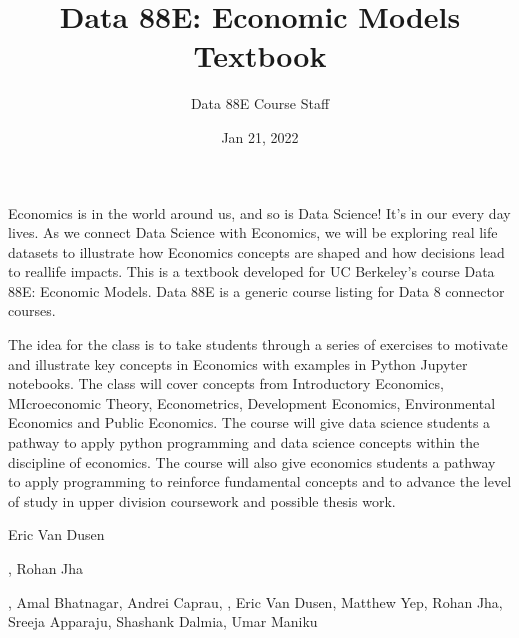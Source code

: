 \documentclass[letterpaper,10pt,english]{jupyterBook}
\title{Data 88E: Economic Models Textbook}
\date{Jan 21, 2022}
\author{Data 88E Course Staff}
\begin{document}
\pagestyle{empty}
\sphinxmaketitle
\pagestyle{plain}
\sphinxtableofcontents
\pagestyle{normal}
\label{\detokenize{content/intro::doc}}


\sphinxAtStartPar
Economics is in the world around us, and so is Data Science! It’s in our every day lives. As we connect Data Science with Economics, we will be exploring real life datasets to illustrate how Economics concepts are shaped and how decisions lead to real\sphinxhyphen{}life impacts. This is a textbook developed for UC Berkeley’s course Data 88E: Economic Models. Data 88E is a generic course listing for Data 8 connector courses.

\begin{DUlineblock}{0em}
\item[] 
\end{DUlineblock}

\sphinxAtStartPar
The idea for the class is to take students through a series of exercises to motivate and illustrate key concepts in Economics with examples in Python Jupyter notebooks. The class will cover concepts from Introductory Economics, MIcroeconomic Theory, Econometrics, Development Economics, Environmental Economics and Public Economics. The course will give data science students a pathway to apply python programming and data science concepts within the discipline of economics. The course will also give economics students a pathway to apply programming to reinforce fundamental concepts and to advance the level of study in upper division coursework and possible thesis work.

\begin{DUlineblock}{0em}
\item[] 
\end{DUlineblock}

\sphinxAtStartPar
{} Eric Van Dusen

\sphinxAtStartPar
{} , Rohan Jha

\sphinxAtStartPar
{} , Amal Bhatnagar, Andrei Caprau, , Eric Van Dusen, Matthew Yep, Rohan Jha, Sreeja Apparaju, Shashank Dalmia, Umar Maniku

\begin{DUlineblock}{0em}
\item[] 
\end{DUlineblock}
\end{document}
